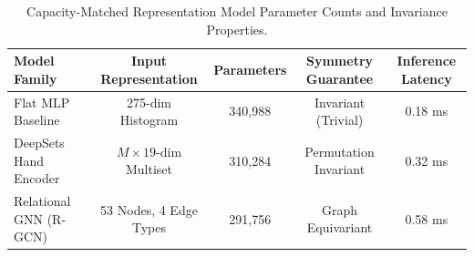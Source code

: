 \begin{table}[t]
\centering
\caption{Capacity-Matched Representation Model Parameter Counts and Invariance Properties.}
\label{tab:models}
\small
\begin{tabular}{lcccc}
\toprule
\textbf{Model Family} & \textbf{Input Representation} & \textbf{Parameters} & \textbf{Symmetry Guarantee} & \textbf{Inference Latency} \\
\midrule
Flat MLP Baseline & 275-dim Histogram & 340,988 & Invariant (Trivial) & 0.18 ms \\
DeepSets Hand Encoder & $M \times 19$-dim Multiset & 310,284 & Permutation Invariant & 0.32 ms \\
Relational GNN (R-GCN) & 53 Nodes, 4 Edge Types & 291,756 & Graph Equivariant & 0.58 ms \\
\bottomrule
\end{tabular}
\end{table}
